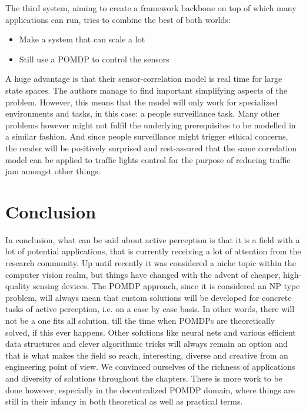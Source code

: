 \documentclass[12pt,twoside]{article}
\theoremstyle{plain}
\theoremstyle{definition}
\theoremstyle{remark}
\begin{document}
The third system, aiming to create a framework backbone on top of which many applications can run, tries to combine the best of both worlds:
\begin{itemize}
\item Make a system that can scale a lot
\item Still use a POMDP to control the sensors
\end{itemize}

A huge advantage is that their sensor-correlation model is real time for large state spaces. The authors manage to find important simplifying aspects of the problem. However, this means that the model will only work for specialized environments and tasks, in this case: a people surveillance task. Many other problems however might not fulfil the underlying prerequisites to be modelled in a similar fashion. And since people surveillance might trigger ethical concerns, the reader will be positively surprised and rest-assured that the same correlation model can be applied to traffic lights control for the purpose of reducing traffic jam amongst other things.


\section{Conclusion}
In conclusion, what can be said about active perception is that it is a field with a lot of potential applications, that is currently receiving a lot of attention from the research community. Up until recently it was considered a niche topic within the computer vision realm, but things have changed with the advent of cheaper, high-quality sensing devices. The POMDP approach, since it is considered an NP type problem, will always mean that custom solutions will be developed for concrete tasks of active perception, i.e. on a case by case basis. In other words, there will not be a one fits all solution, till the time when POMDPs are theoretically solved, if this ever happens. Other solutions like neural nets and various efficient data structures and clever algorithmic tricks will always remain an option and that is what makes the field so reach, interesting, diverse and creative from an engineering point of view. We convinced ourselves of the richness of applications and diversity of solutions throughout the chapters. There is more work to be done however, especially in the decentralized POMDP domain, where things are still in their infancy in both theoretical as well as practical terms.




\end{document}
